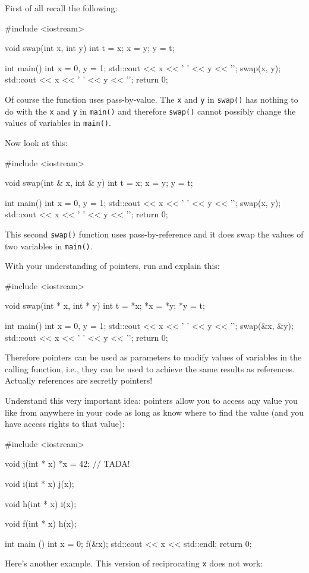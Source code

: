 First of all recall the following:

\begin{consolethree}[escapeinside=||]
#include <iostream>

void swap(int x, int y)
{
    int t = x;
    x = y;
    y = t;
}

int main()
{   
    int x = 0, y = 1;
    std::cout << x << ' ' << y << '\n';
    swap(x, y);
    std::cout << x << ' ' << y << '\n';
    return 0;
}
\end{consolethree}
Of course the function uses pass-by-value. The \texttt{x} and \texttt{y} in \texttt{swap()} has nothing to do with the \texttt{x} and \texttt{y} in \texttt{main()} and therefore \texttt{swap()} cannot possibly change the values of variables in \texttt{main()}.

Now look at this:

\begin{consolethree}[escapeinside=||]
#include <iostream>

void swap(int & x, int & y)
{    
     int t = x;
     x = y;
     y = t;
}

int main()
{   
    int x = 0, y = 1;
    std::cout << x << ' ' << y << '\n';
    swap(x, y);
    std::cout << x << ' ' << y << '\n';
    return 0;
}
\end{consolethree}
This second \texttt{swap()} function uses pass-by-reference and it does swap the values of two variables in \texttt{main()}.

With your understanding of pointers, run and explain this:

\begin{consolethree}[escapeinside=||]
#include <iostream>

void swap(int * x, int * y)
{    
     int t = *x;
     *x = *y;
     *y = t;
}

int main()
{   
    int x = 0, y = 1;
    std::cout << x << ' ' << y << '\n';
    swap(&x, &y);
    std::cout << x << ' ' << y << '\n';
    return 0;
}
\end{consolethree}
Therefore pointers can be used as parameters to modify values of variables in the calling function, i.e., they can be used to achieve the same results as references. Actually references are secretly pointers!

Understand this very important idea: pointers allow you to access any value you like from anywhere in your code as long as know where to find the value (and you have access rights to that value):

\begin{consolethree}[escapeinside=||]

#include <iostream>

void j(int * x)
{    
     *x = 42; // TADA!
}

void i(int * x)
{
    j(x);
}

void h(int * x)
{
    i(x);
}

void f(int * x)
{
    h(x);
}

int main ()
{
    int x = 0;
    f(&x);
    std::cout << x << std::endl;
    return 0;
}
\end{consolethree}
Here's another example. This version of reciprocating \texttt{x} does not
work:

